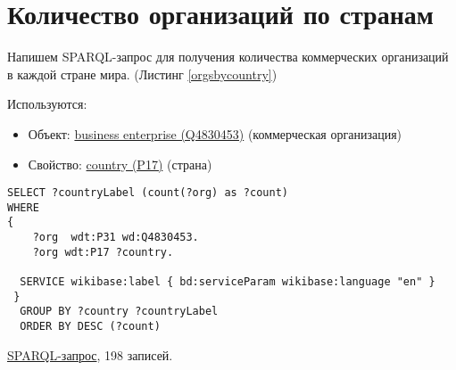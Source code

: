 \section*{Количество организаций по странам}

Напишем SPARQL-запрос для получения количества коммерческих организаций в каждой стране мира. (Листинг \ref{orgsbycountry})

Используются:
\begin{itemize}
    \item Объект: \href{https://www.wikidata.org/wiki/Q4830453}{business enterprise (Q4830453)} (коммерческая организация)
    \item Свойство: \href{https://www.wikidata.org/wiki/Property:P17}{country (P17)} (страна)
\end{itemize}

\begin{lstlisting}[language=SPARQL,label=orgsbycountry,caption=Количество организаций в каждой стране мира]
SELECT ?countryLabel (count(?org) as ?count)
WHERE
{
    ?org  wdt:P31 wd:Q4830453.
    ?org wdt:P17 ?country.

  SERVICE wikibase:label { bd:serviceParam wikibase:language "en" }
 }
  GROUP BY ?country ?countryLabel
  ORDER BY DESC (?count)
\end{lstlisting}

\href{https://query.wikidata.org/#SELECT%20%3FcountryLabel%20%28count%28%3Forg%29%20as%20%3Fcount%29%0AWHERE%0A%7B%0A%20%20%20%20%3Forg%20%20wdt%3AP31%20wd%3AQ4830453.%0A%20%20%20%20%3Forg%20wdt%3AP17%20%3Fcountry.%0A%0A%20%20SERVICE%20wikibase%3Alabel%20%7B%20bd%3AserviceParam%20wikibase%3Alanguage%20%22en%22%20%7D%0A%20%7D%0A%20%20GROUP%20BY%20%3Fcountry%20%3FcountryLabel%0A%20%20ORDER%20BY%20DESC%20%28%3Fcount%29%0A}{SPARQL-запрос}, 198 записей.
